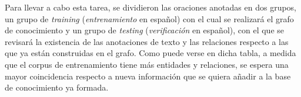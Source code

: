 Para llevar a cabo esta tarea, se dividieron las oraciones anotadas en dos grupos, un grupo de \textit{training} (\textit{entrenamiento} en español) con el cual se realizará el grafo de conocimiento y un grupo de \textit{testing} (\textit{verificación} en español), con el que se revisará la existencia de las anotaciones de texto y las relaciones respecto a las que ya están construidas en el grafo. Como puede verse en dicha tabla, a medida que el corpus de entrenamiento tiene más entidades y relaciones, se espera una mayor coincidencia respecto a nueva información que se quiera añadir a la base de conocimiento ya formada.
